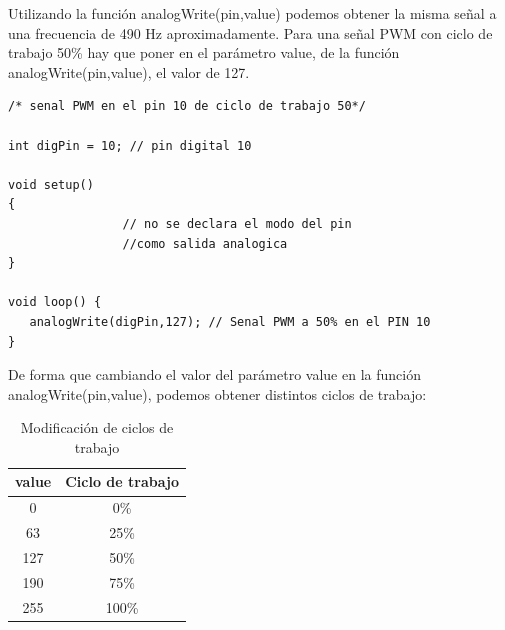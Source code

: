Utilizando la función analogWrite(pin,value) podemos obtener la misma señal a una frecuencia de 490 Hz aproximadamente. Para una señal PWM con ciclo de trabajo 50\% hay que poner en el parámetro value, de la función analogWrite(pin,value), el valor de 127.\\
\begin{lstlisting}
/* senal PWM en el pin 10 de ciclo de trabajo 50*/

int digPin = 10; // pin digital 10

void setup() 
{
                // no se declara el modo del pin 
                //como salida analogica
}

void loop() {
   analogWrite(digPin,127); // Senal PWM a 50% en el PIN 10
}
\end{lstlisting}
\newpage{}
De forma que cambiando el valor del parámetro value en la función analogWrite(pin,value), podemos obtener distintos ciclos de trabajo:
\begin{table}[!hpt]
	\centering
	\begin{tabular}{|c|c|}
	\hline
	value & Ciclo de trabajo \\
	\hline
	0 & 0\% \\
	\hline
	63&25\%\\
	\hline
	127 & 50\% \\
	\hline
	190 & 75\% \\
	\hline
	255 & 100\%\\	
	\hline
	\end{tabular}
	\caption{Modificación de ciclos de trabajo}
\end{table}